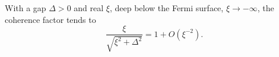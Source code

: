 \documentclass{article}
\begin{document}
With a gap $\Delta>0$ and real $\xi$, deep below the Fermi surface, $\xi\to-\infty$, the coherence factor tends to
\begin{equation}
\frac{\xi}{\sqrt{\xi^2+\Delta^2}} = 1 + O(\xi^{-2}) .
\label{eq:deep}
\end{equation}
\end{document}
